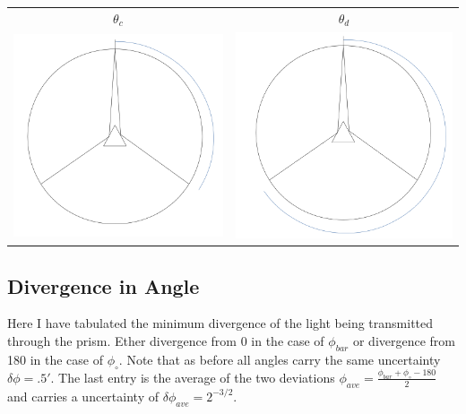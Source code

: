 \documentclass[12pt,a4paper]{article}
\begin{document}
\begin{tabular}{c c}
$\theta_c$ & $\theta_d$\\
\includegraphics[scale=.15]{a3} & \includegraphics[scale=.15]{a4}

\end{tabular}
\subsection{Divergence in Angle}
Here I have tabulated the minimum divergence of the light being transmitted through the prism.  Ether divergence from 0 in the case of $\phi_{bar}$ or divergence from 180 in the case of $\phi_\circ$.  Note that as before all angles carry the same uncertainty $\delta\phi=.5'$.  The last entry is the average of the two deviations $\phi_{ave}=\frac{\phi_{bar}+\phi_{\circ}-180}{2}$ and carries a uncertainty of $\delta\phi_{ave}=2^{-3/2}$.
\end{document}
